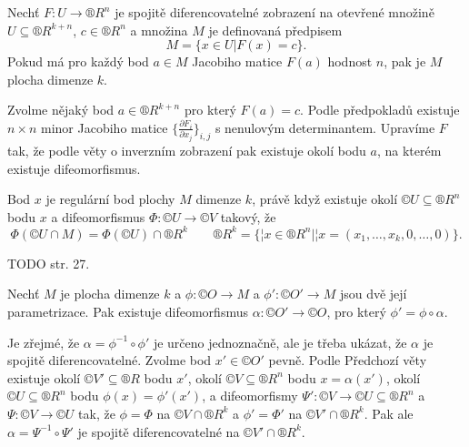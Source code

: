 \documentclass[12pt]{article}                   %
\begin{document}
        \begin{veta}
            Nechť $F: U \rightarrow ®R^n$ je spojitě diferencovatelné zobrazení na otevřené množině $U \subseteq ®R^{k + n}$, $c \in ®R^n$ a množina $M$ je definovaná předpisem
            $$ M = \{x \in U | F(x) = c\}. $$
            Pokud má pro každý bod $a \in M$ Jacobiho matice $F(a)$ hodnost $n$, pak je $M$ plocha dimenze $k$.

            \begin{dukazin}
                Zvolme nějaký bod $a \in ®R^{k+n}$ pro který $F(a) = c$. Podle předpokladů existuje $n \times n$ minor Jacobiho matice $\{\frac{\partial F_i}{\partial x_j}\}_{i,j}$ s nenulovým determinantem. Upravíme $F$ tak, že podle věty o inverzním zobrazení pak existuje okolí bodu $a$, na kterém existuje difeomorfismus.
            \end{dukazin}
        \end{veta}

        \begin{veta}
            Bod $x$ je regulární bod plochy $M$ dimenze $k$, právě když existuje okolí $©U \subseteq ®R^n$ bodu $x$ a difeomorfismus $\Phi: ©U \rightarrow ©V$ takový, že
            $$ \Phi(©U \cap M) = \Phi(©U) \cap ®R^k \qquad ®R^k = \{¦x \in ®R^n | ¦x = (x_1, …, x_k, 0, …, 0)\}. $$

            \begin{dukazin}
                TODO str. 27.
            \end{dukazin}
        \end{veta}

        \begin{lemma}
            Nechť $M$ je plocha dimenze $k$ a $\phi: ©O \rightarrow M$ a $\phi': ©O' \rightarrow M$ jsou dvě její parametrizace. Pak existuje difeomorfismus $\alpha: ©O' \rightarrow ©O$, pro který $\phi' = \phi \circ \alpha$.

            \begin{dukazin}
                Je zřejmé, že $\alpha = \phi^{-1} \circ \phi'$ je určeno jednoznačně, ale je třeba ukázat, že $\alpha$ je spojitě diferencovatelné. Zvolme bod $x' \in ©O'$ pevně. Podle Předchozí věty existuje okolí $©V' \subseteq ®R$ bodu $x'$, okolí $©V \subseteq ®R^n$ bodu $x = \alpha(x')$, okolí $©U \subseteq ®R^n$ bodu $\phi(x) = \phi'(x')$, a difeomorfismy $\Psi': ©V \rightarrow ©U \subseteq ®R^n$ a $\Psi: ©V \rightarrow ©U$ tak, že $\phi = \Phi$ na $©V \cap ®R^k$ a $\phi' = \Phi'$ na $©V' \cap ®R^k$. Pak ale $\alpha = \Psi^{-1} \circ \Psi'$ je spojitě diferencovatelné na $©V' \cap ®R^k$.
            \end{dukazin}
        \end{lemma}
\end{document}
